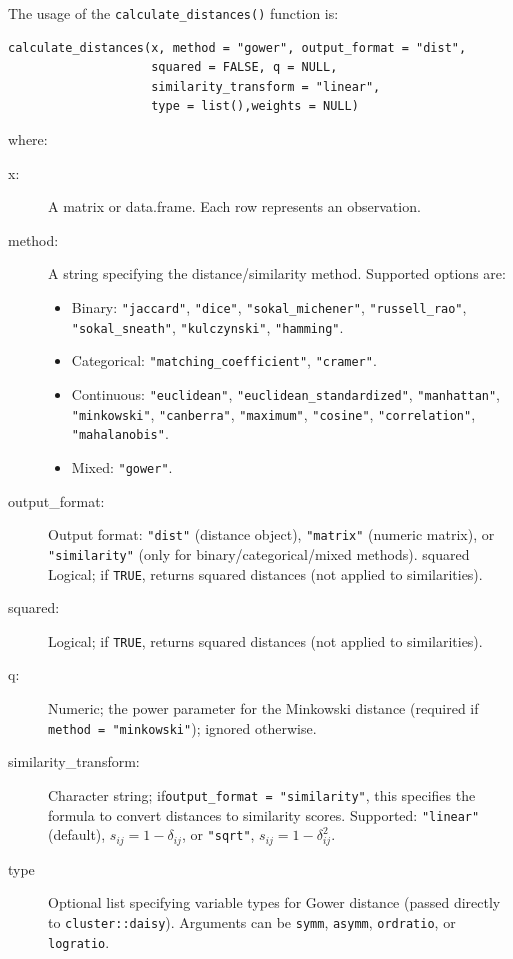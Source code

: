 The usage of the \texttt{calculate\_distances()} function is:

\begin{verbatim}
calculate_distances(x, method = "gower", output_format = "dist",
                    squared = FALSE, q = NULL, 
                    similarity_transform = "linear", 
                    type = list(),weights = NULL)
\end{verbatim}

where:
\begin{description}
  \item[x:] A matrix or data.frame. Each row represents an observation.
  \item[method:] A string specifying the distance/similarity method. Supported options are:
\begin{itemize}
    \item Binary: \texttt{"jaccard"}, \texttt{"dice"}, \texttt{"sokal\_michener"}, \texttt{"russell\_rao"}, \texttt{"sokal\_sneath"}, \texttt{"kulczynski"}, \texttt{"hamming"}.
    \item Categorical: \texttt{"matching\_coefficient"}, \texttt{"cramer"}.
    \item Continuous: \texttt{"euclidean"}, \texttt{"euclidean\_standardized"}, \texttt{"manhattan"}, \texttt{"minkowski"}, \texttt{"canberra"}, \texttt{"maximum"}, \texttt{"cosine"}, \texttt{"correlation"}, \texttt{"mahalanobis"}.
    \item Mixed: \texttt{"gower"}.
\end{itemize}
	  \item[output\_format:] Output format:  \texttt{"dist"} (distance object), \texttt{"matrix"} (numeric matrix), or \texttt{"similarity"}
    (only for binary/categorical/mixed methods).
    squared Logical; if \texttt{TRUE}, returns squared distances (not applied to similarities).
  \item[squared:] Logical; if \texttt{TRUE}, returns squared distances (not applied to similarities).
  \item[q:] Numeric; the power parameter for the Minkowski distance (required if \texttt{method = "minkowski"}); ignored otherwise.
  \item[similarity\_transform:] Character string; if\texttt{output\_format = "similarity"}, this specifies the formula
to convert distances to similarity scores. Supported: \texttt{"linear"} (default), $s_{ij} = 1-\delta_{ij}$,  or
\texttt{"sqrt"}, $s_{ij} = 1-\delta_{ij}^{2}$.
\item[type] Optional list specifying variable types for Gower distance (passed directly to
\texttt{cluster::daisy}). Arguments can be \texttt{symm}, \texttt{asymm}, \texttt{ordratio}, or \texttt{logratio}.


\end{description}
